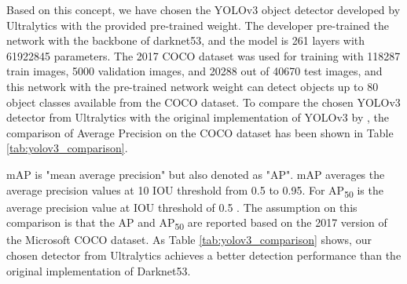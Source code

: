 Based on this concept, we have chosen the YOLOv3 object detector developed by Ultralytics \cite{jocher_ultralyticsyolov3_2021} with the provided pre-trained weight. The developer \citeauthor{jocher_ultralyticsyolov3_2021} pre-trained the network with the backbone of darknet53, and the model is 261 layers with 61922845 parameters. The 2017 COCO dataset was used for training with 118287 train images, 5000 validation images, and 20288 out of 40670 test images, and this network with the pre-trained network weight can detect objects up to 80 object classes available from the COCO dataset. To compare the chosen YOLOv3 detector from Ultralytics with the original implementation of YOLOv3 by \citeauthor{redmon_yolov3_2018}, the comparison of Average Precision on the COCO dataset has been shown in Table \ref{tab:yolov3_comparison}.

mAP is "mean average precision" but also denoted as "AP". mAP averages the average precision values at 10 IOU threshold from 0.5 to 0.95. For AP\textsubscript{50} is the average precision value at IOU threshold of 0.5 \cite{noauthor_coco_nodate}. The assumption on this comparison is that the AP and AP\textsubscript{50} are reported based on the 2017 version of the Microsoft COCO dataset. As Table \ref{tab:yolov3_comparison} shows, our chosen detector from Ultralytics achieves a better detection performance than the original implementation of Darknet53.